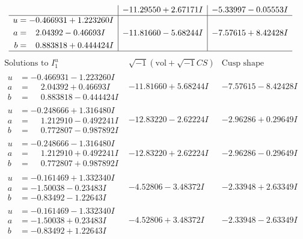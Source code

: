 \documentclass[1p]{elsarticle_modified}
\theoremstyle{definition}
\newcommand{\I}{\sqrt{-1}}
\begin{document}
$$\begin{array}{c|c|c}
 & -11.29550 + 2.67171 I & -5.33997 - 0.05553 I \\ \hline\begin{aligned}
u &= -0.466931 + 1.223260 I \\
a &= \phantom{-}2.04392 - 0.46693 I \\
b &= \phantom{-}0.883818 + 0.444424 I\end{aligned}
 & -11.81660 - 5.68244 I & -7.57615 + 8.42428 I\\
 \hline 
 \end{array}$$\newpage$$\begin{array}{c|c|c}  
\text{Solutions to }I^u_{1}& \I (\text{vol} + \sqrt{-1}CS) & \text{Cusp shape}\\
 \hline 
\begin{aligned}
u &= -0.466931 - 1.223260 I \\
a &= \phantom{-}2.04392 + 0.46693 I \\
b &= \phantom{-}0.883818 - 0.444424 I\end{aligned}
 & -11.81660 + 5.68244 I & -7.57615 - 8.42428 I \\ \hline\begin{aligned}
u &= -0.248666 + 1.316480 I \\
a &= \phantom{-}1.212910 - 0.492241 I \\
b &= \phantom{-}0.772807 - 0.987892 I\end{aligned}
 & -12.83220 - 2.62224 I & -2.96286 + 0.29649 I \\ \hline\begin{aligned}
u &= -0.248666 - 1.316480 I \\
a &= \phantom{-}1.212910 + 0.492241 I \\
b &= \phantom{-}0.772807 + 0.987892 I\end{aligned}
 & -12.83220 + 2.62224 I & -2.96286 - 0.29649 I \\ \hline\begin{aligned}
u &= -0.161469 + 1.332340 I \\
a &= -1.50038 - 0.23483 I \\
b &= -0.83492 - 1.22643 I\end{aligned}
 & -4.52806 - 3.48372 I & -2.33948 + 2.63349 I \\ \hline\begin{aligned}
u &= -0.161469 - 1.332340 I \\
a &= -1.50038 + 0.23483 I \\
b &= -0.83492 + 1.22643 I\end{aligned}
 & -4.52806 + 3.48372 I & -2.33948 - 2.63349 I \\ \hline\begin{aligned}

\end{aligned}
\end{array}$$
\end{document}
